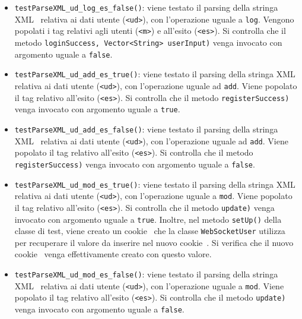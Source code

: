 {\begin{sloppypar}
{{\begin{itemize}
\begin{itemize}
\begin{itemize}
						\item \texttt{testParseXML\_ud\_log\_es\_false()}: viene testato il parsing della stringa XML\g~ relativa ai dati utente (\texttt{<ud>}), con l'operazione uguale a \texttt{log}. Vengono popolati i tag relativi agli utenti (\texttt{<m>}) e all'esito (\texttt{<es>}). Si controlla che il metodo   \texttt{loginSuccess, Vector<String> userInput)} venga invocato con argomento uguale a \texttt{false}.
						
						\item \texttt{testParseXML\_ud\_add\_es\_true()}: viene testato il parsing della stringa XML\g~ relativa ai dati utente (\texttt{<ud>}), con l'operazione uguale ad \texttt{add}. Viene popolato il tag relativo all'esito (\texttt{<es>}). Si controlla che il metodo   \texttt{registerSuccess)} venga invocato con argomento uguale a \texttt{true}.
						
						\item \texttt{testParseXML\_ud\_add\_es\_false()}: viene testato il parsing della stringa XML\g~ relativa ai dati utente (\texttt{<ud>}), con l'operazione uguale ad \texttt{add}. Viene popolato il tag relativo all'esito (\texttt{<es>}). Si controlla che il metodo   \texttt{registerSuccess)} venga invocato con argomento uguale a \texttt{false}.
						
						\item \texttt{testParseXML\_ud\_mod\_es\_true()}: viene testato il parsing della stringa XML\g~ relativa ai dati utente (\texttt{<ud>}), con l'operazione uguale a \texttt{mod}. Viene popolato il tag relativo all'esito (\texttt{<es>}). Si controlla che il metodo   \texttt{update)} venga invocato con argomento uguale a \texttt{true}. Inoltre, nel metodo \texttt{setUp()} della classe di test, viene creato un cookie\g~ che la classe \texttt{WebSocketUser} utilizza per recuperare il valore da inserire nel nuovo cookie\g~. Si verifica che il nuovo cookie\g~ venga effettivamente creato con questo valore. 
						
						\item \texttt{testParseXML\_ud\_mod\_es\_false()}: viene testato il parsing della stringa XML\g~ relativa ai dati utente (\texttt{<ud>}), con l'operazione uguale a \texttt{mod}. Viene popolato il tag relativo all'esito (\texttt{<es>}). Si controlla che il metodo   \texttt{update)} venga invocato con argomento uguale a \texttt{false}.
						

\end{itemize}
\end{itemize}
\end{itemize}}}
\end{sloppypar}}
